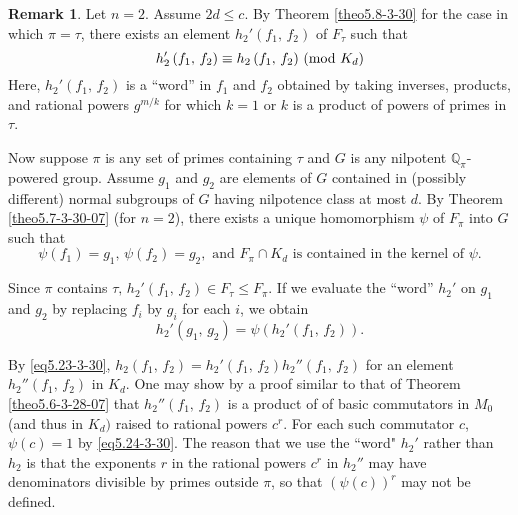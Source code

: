\documentclass[mathscr]{amsart}
\theoremstyle{theorem}
\theoremstyle{definition}
\newtheorem{remark}[theorem]{Remark}
\numberwithin{equation}{section}
\newcommand{\smod}[1]{\hspace*{-.1cm}\pmod{#1}}
\def \({\left(}
\def \){\right)}
\begin{document}
\begin{remark}\label{rem5.11-3-30}
Let $n=2$. Assume $2d\leq c$. By Theorem \ref{theo5.8-3-30} for the
case in which $\pi=\tau$, there exists an element
$h_2'\(f_1,\,f_2\)$ of $F_\tau$ such that
\begin{equation}\label{eq5.23-3-30}
h_2'\(f_1,\,f_2\)\equiv h_2\(f_1,\,f_2\)\smod{K_d}
\end{equation}
Here, $h_2'\(f_1,\,f_2\)$ is a ``word'' in $f_1$ and $f_2$ obtained
by taking inverses, products, and rational powers $g^{m/k}$ for
which $k=1$ or $k$ is a product of powers of primes in $\tau$.

Now suppose $\pi$ is any set of primes containing $\tau$ and $G$ is
any nilpotent $\mathbb{Q}_\pi$-powered group.  Assume $g_1$ and
$g_2$ are elements of $G$ contained in (possibly different) normal
subgroups of $G$ having nilpotence class at most $d$.  By Theorem
\ref{theo5.7-3-30-07} (for $n=2$), there exists a unique
homomorphism $\psi$ of $F_\pi$ into $G$ such that
\begin{equation}\label{eq5.24-3-30}
\psi\(f_1\)=g_1,\,\psi\(f_2\)=g_2,\text{ and }F_\pi\cap K_d\text{ is
contained in the kernel of }\psi.
\end{equation}


Since $\pi$ contains $\tau,\, h_2'\(f_1,\,f_2\)\in F_\tau\leq
F_\pi$.  If we evaluate the ``word'' $h_2'$ on $g_1$ and $g_2$ by
replacing $f_i$ by $g_i$ for each $i$, we obtain
\begin{equation}\label{eq5.25-3-30}
h_2'\(g_1,\,g_2\)=\psi\(h_2'\(f_1,\,f_2\)\).
\end{equation}

By \eqref{eq5.23-3-30},
$h_2(f_1,\,f_2)=h_2'(f_1,\,f_2)h_2''(f_1,\,f_2)$ for an element
$h_2''(f_1,\,f_2)$ in $K_d$. One may show by a proof similar to that
of Theorem \ref{theo5.6-3-28-07} that $h_2''(f_1,\,f_2)$ is a
product of of basic commutators in $M_0$ (and thus in $K_d)$ raised
to rational powers $c^r$. For each such commutator $c$, $\psi(c)=1$
by \eqref{eq5.24-3-30}. The reason that we use the ``word" $h_2'$
rather than $h_2$ is that the exponents $r$ in the rational powers
$c^r$ in $h_2''$ may have denominators divisible by primes outside
$\pi$, so that $(\psi(c))^r$ may not be defined.


\end{remark}
\end{document}
